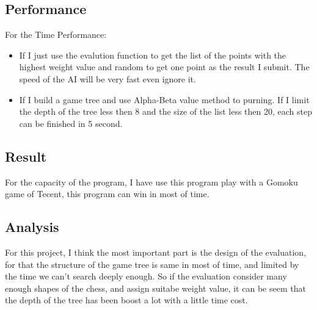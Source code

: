 \documentclass[conference,compsoc]{IEEEtran}
\begin{document}
\subsection{Performance}
For the Time Performance:
\begin{itemize}
  \item If I just use the evalution function to get the list of the points with the highest weight value and random to get one point as the result I submit. The speed of the AI will be very fast even ignore it.
  \item If I  build a game tree and use Alpha-Beta value method to purning. If I limit the depth of the tree less then 8 and the size of the list less then 20, each step can be finished in 5 second.
\end{itemize}

\subsection{Result}
For the capacity of the program, I have use this program play with a Gomoku game of Tecent, this program can win in most of time.
\subsection{Analysis}
For this project, I think the most important part is the design of the evaluation, for that the structure of the game tree is same in most of time, and limited by the time we can't search deeply enough. 
So if the evaluation consider many enough shapes of the chess, and assign suitabe weight value, it can be seem that the depth of the tree has been boost a lot with a little time cost.






\cite{rivest1987game}
\cite{knuth1975analysis}
\end{document}
